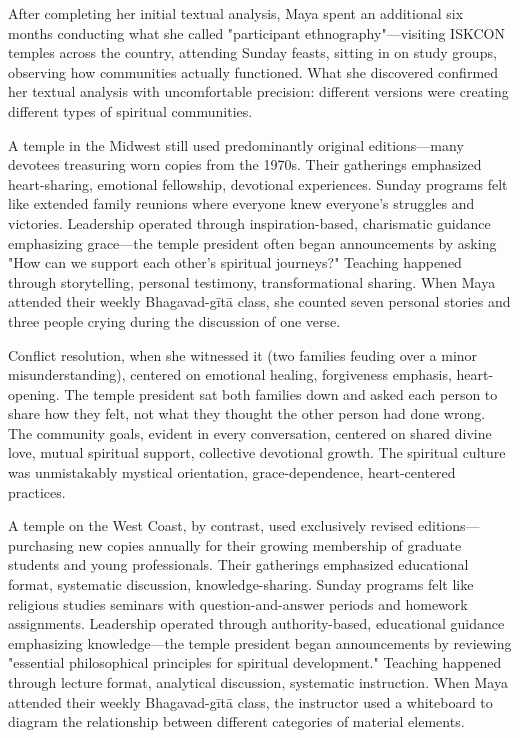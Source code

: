 \documentclass[12pt,twoside]{book}
\begin{document}
After completing her initial textual analysis, Maya spent an additional six months conducting what she called "participant ethnography"—visiting ISKCON temples across the country, attending Sunday feasts, sitting in on study groups, observing how communities actually functioned. What she discovered confirmed her textual analysis with uncomfortable precision: different versions were creating different types of spiritual communities.

A temple in the Midwest still used predominantly original editions—many devotees treasuring worn copies from the 1970s. Their gatherings emphasized heart-sharing, emotional fellowship, devotional experiences. Sunday programs felt like extended family reunions where everyone knew everyone's struggles and victories. Leadership operated through inspiration-based, charismatic guidance emphasizing grace—the temple president often began announcements by asking "How can we support each other's spiritual journeys?" Teaching happened through storytelling, personal testimony, transformational sharing. When Maya attended their weekly Bhagavad-gītā class, she counted seven personal stories and three people crying during the discussion of one verse.

Conflict resolution, when she witnessed it (two families feuding over a minor misunderstanding), centered on emotional healing, forgiveness emphasis, heart-opening. The temple president sat both families down and asked each person to share how they felt, not what they thought the other person had done wrong. The community goals, evident in every conversation, centered on shared divine love, mutual spiritual support, collective devotional growth. The spiritual culture was unmistakably mystical orientation, grace-dependence, heart-centered practices.

A temple on the West Coast, by contrast, used exclusively revised editions—purchasing new copies annually for their growing membership of graduate students and young professionals. Their gatherings emphasized educational format, systematic discussion, knowledge-sharing. Sunday programs felt like religious studies seminars with question-and-answer periods and homework assignments. Leadership operated through authority-based, educational guidance emphasizing knowledge—the temple president began announcements by reviewing "essential philosophical principles for spiritual development." Teaching happened through lecture format, analytical discussion, systematic instruction. When Maya attended their weekly Bhagavad-gītā class, the instructor used a whiteboard to diagram the relationship between different categories of material elements.
\end{document}
